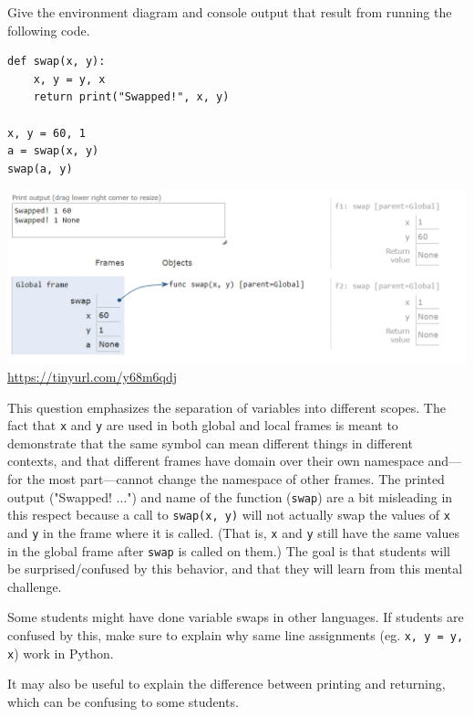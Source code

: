 \begin{blocksection}
\question Give the environment diagram and console output that result from running the following code.

\begin{lstlisting}
def swap(x, y):
    x, y = y, x
    return print("Swapped!", x, y)

x, y = 60, 1
a = swap(x, y)
swap(a, y)
\end{lstlisting}

\begin{solution}[2in]
\includegraphics[scale=0.5]{swap.png}
\\
\url{https://tinyurl.com/y68m6qdj}
\end{solution}
\end{blocksection}

\begin{questionmeta}
  This question emphasizes the separation of variables into different scopes. The fact that \lstinline{x} and \lstinline{y} are used in both global and local frames is meant to demonstrate that the same symbol can mean different things in different contexts, and that different frames have domain over their own namespace and---for the most part---cannot change the namespace of other frames. The printed output ("Swapped! ...") and name of the function (\lstinline{swap}) are a bit misleading in this respect because a call to \lstinline{swap(x, y)} will not actually swap the values of \lstinline{x} and \lstinline{y} in the frame where it is called. (That is, \lstinline{x} and \lstinline{y} still have the same values in the global frame after \lstinline{swap} is called on them.) The goal is that students will be surprised/confused by this behavior, and that they will learn from this mental challenge. 

  Some students might have done variable swaps in other languages. If students are confused by this, make sure to explain why same line assignments (eg. \lstinline{x, y = y, x}) work in Python.

  It may also be useful to explain the difference between printing and returning, which can be confusing to some students. 
\end{questionmeta}
